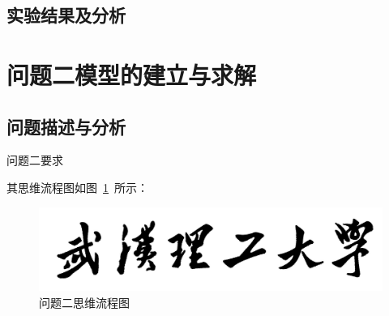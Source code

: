 \documentclass{whutmod}
\begin{document}

		
        \subsection{实验结果及分析}
  
	\section{问题二模型的建立与求解}
		\subsection{问题描述与分析}
			问题二要求

    		其思维流程图如图~\ref{lssssct}~所示：

			\begin{figure}[H]
				\centering
				\includegraphics[width=\textwidth]{figures/whut.jpg}
				\caption{问题二思维流程图}\label{lssssct}
			\end{figure}
\end{document}
